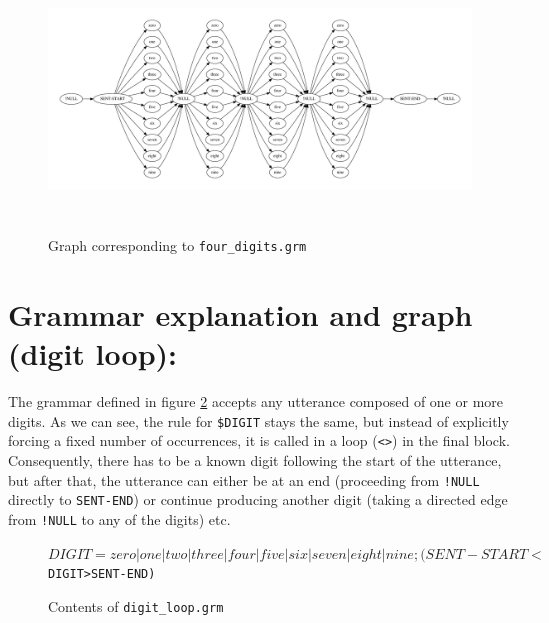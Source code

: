 \documentclass[onecolumn]{article}
\begin{document}
\begin{figure}[htbp]
    \centering
    \includegraphics[height=7cm]{four_digits}
    \caption{Graph corresponding to \texttt{four\_digits.grm}}
    \label{fig:four_digits_graph}
\end{figure}

\clearpage
\section*{Grammar explanation and graph (digit loop):}
The grammar defined in figure \ref{fig:digit_loop_grm} accepts any utterance composed of one or more digits. As we can see, the rule for \verb|$DIGIT| stays the same, but instead of explicitly forcing a fixed number of occurrences, it is called in a loop (\verb|<>|) in the final block. Consequently, there has to be a known digit following the start of the utterance, but after that, the utterance can either be at an end (proceeding from \verb|!NULL| directly to \verb|SENT-END|) or continue producing another digit (taking a directed edge from \verb|!NULL| to any of the digits) etc.

\begin{figure}[htbp]
  \centering
  \begin{minipage}{14cm}
    {%
    \begin{alltt}
$DIGIT =  zero | one | two | three | four | five | six | seven | eight | nine ;

( SENT-START <$DIGIT> SENT-END )
    \end{alltt}}
  \end{minipage}
  \caption{Contents of \texttt{digit\_loop.grm}}
  \label{fig:digit_loop_grm}
\end{figure}
\end{document}

